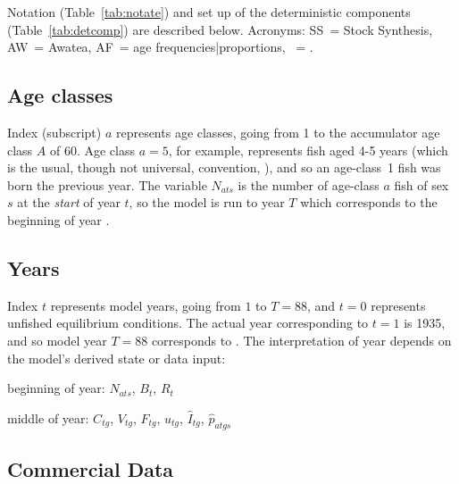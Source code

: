 \documentclass[11pt]{book}
\begin{document}
Notation (Table~\ref{tab:notate}) and set up of the deterministic components (Table~\ref{tab:detcomp}) are described below. Acronyms: SS~= Stock Synthesis, AW~= Awatea, AF~= age frequencies|proportions, \spc~= \spn.


\subsection{Age classes}

Index (subscript) $a$ represents age classes, going from 1 to the accumulator age class $A$ of 60. 
Age class $a=5$, for example, represents fish aged 4-5 years (which is the usual, though not universal, convention, \citealt{Caswell:2001}), and so an age-class~1 fish was born the previous year.
The variable $N_{ats}$ is the number of age-class $a$ fish of sex $s$ at the \textit{start} of year $t$, so the model is run to year $T$ which corresponds to the beginning of year \finalYr.

\subsection{Years}

Index $t$ represents model years, going from $1$ to $T=88$, and $t=0$ represents unfished equilibrium conditions. 
The actual year corresponding to $t=1$ is 1935, and so model year $T=88$ corresponds to \finalYr.
The interpretation of year depends on the model's derived state or data input:
\begin{itemize_csas}{}{}
\item beginning of year: $N_{ats}$, $B_t$, $R_t$
\item middle of year: $C_{tg}$, $V_{tg}$, $F_{tg}$, $u_{tg}$, $\widehat{I}_{tg}$, $\widehat{p}_{atgs}$
\end{itemize_csas}

\subsection{Commercial Data}
\end{document}
